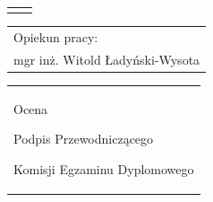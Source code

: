 \begin{titlepage}
{\begin{center}
	\vspace*{7\baselineskip}
	\hfill\mbox{}\par\vspace*{\baselineskip}\noindent
	\begin{tabular}[b]{@{}p{3cm}@{\ }l@{}}
	    {\large\hfill } & {\large }
	\end{tabular}
	\hfill
	\begin{tabular}[b]{@{}l@{}}
	Opiekun pracy: \\[\smallskipamount]
	{\large mgr inż. Witold Ładyński-Wysota}
	\end{tabular}\par
	\vspace*{4\baselineskip}
    \begin{tabular}{p{\textwidth}}
    \begin{flushleft}
	\begin{minipage}{7cm}
	Ocena \dotfill
	\par\vspace{1.6\baselineskip}
	\dotfill
	\par\noindent
	\centerline{\footnotesize Podpis Przewodniczącego} \par
	\centerline{\footnotesize Komisji Egzaminu Dyplomowego}\par
	\end{minipage}
    \end{flushleft}
    \end{tabular}
    \end{center}}


\end{titlepage}
